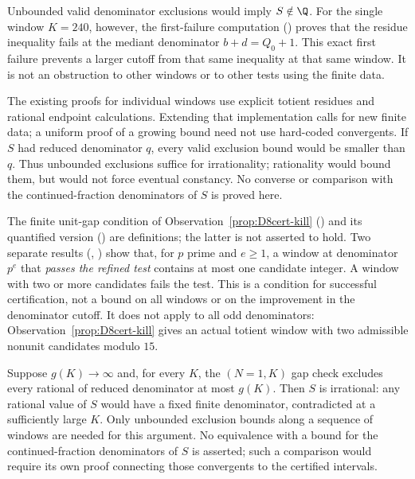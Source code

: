 \begin{rem}
Unbounded valid denominator exclusions would imply $S\notin\Q$.
For the single window $K=240$, however, the first-failure computation
()
proves that the residue inequality fails at the mediant denominator
$b+d=Q_0+1$. This exact first failure prevents a larger cutoff from
that same inequality at that same window. It is not an obstruction to
other windows or to other tests using the finite data.

The existing proofs for individual windows use explicit totient residues
and rational endpoint calculations. Extending that implementation calls
for new finite data; a uniform proof of a growing bound need not use
hard-coded convergents. If $S$ had reduced denominator $q$, every valid
exclusion bound would be smaller than $q$. Thus unbounded exclusions suffice for irrationality; rationality
would bound them, but would not force eventual constancy.
No converse or comparison with the
continued-fraction denominators of $S$ is proved here.
\end{rem}

\begin{obs}
The finite unit-gap condition of Observation~\ref{prop:D8cert-kill}
()
and its quantified version
()
are definitions; the latter is not asserted to hold. Two separate results
(,
)
show that, for $p$ prime and $e\ge1$,
a window at denominator $p^e$ that \emph{passes the refined test}
contains at most one candidate integer. A window with two or more
candidates fails the test. This is a condition for successful
certification, not a bound on all windows or on the improvement
in the denominator cutoff. It does not apply to all odd denominators:
Observation~\ref{prop:D8cert-kill} gives an actual totient window with
two admissible nonunit candidates modulo $15$.
\end{obs}


\begin{prop}\label{prop:sufficient-extension-3}
Suppose $g(K)\to\infty$ and, for every $K$, the $(N=1,K)$ gap check
excludes every rational of reduced denominator at most $g(K)$.
Then $S$ is irrational: any rational value of $S$ would have a fixed
finite denominator, contradicted at a sufficiently large $K$.
Only unbounded exclusion bounds along a sequence of windows are
needed for this argument. No equivalence with a bound for the
continued-fraction denominators of $S$ is asserted; such a comparison
would require its own proof connecting those convergents to the
certified intervals.
\end{prop}


